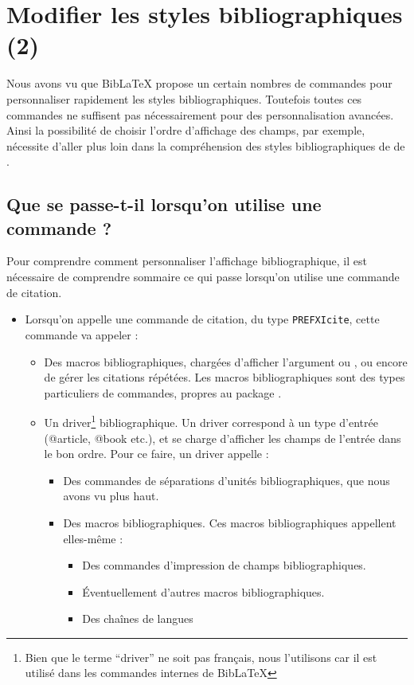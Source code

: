 \chapter{Modifier les styles bibliographiques (2)}

\begin{prealable}
	Nous avons vu que BibLaTeX propose un certain nombres de commandes pour personnaliser rapidement les styles bibliographiques. Toutefois toutes ces commandes ne suffisent pas nécessairement pour des personnalisation avancées. 
	Ainsi la possibilité de choisir l'ordre d'affichage des champs, par exemple, nécessite d'aller plus loin dans la compréhension des styles bibliographiques de de .
\end{prealable}



\section{Que se passe-t-il lorsqu'on utilise une commande  ?}

Pour comprendre comment personnaliser l'affichage bibliographique, il est nécessaire de comprendre sommaire ce qui passe lorsqu'on utilise une commande de citation. 

\begin{itemize}
\item Lorsqu'on appelle une commande de citation, du type \verb|PREFXIcite|, cette commande va appeler :
	\begin{itemize}
		\item Des macros bibliographiques, chargées d'afficher l'argument  ou , ou encore de gérer les citations répétées. Les macros bibliographiques sont des types particuliers de commandes, propres au package . 
		\item Un driver\footnote{Bien que le terme \enquote{driver} ne soit pas français, nous l'utilisons car il est utilisé dans les commandes internes de BibLaTeX} bibliographique. Un driver correspond à un type d'entrée (@article, @book etc.), et se charge d'afficher les champs de l'entrée dans le bon ordre. Pour ce faire, un driver appelle :
		\begin{itemize}
			\item Des commandes de séparations d'unités bibliographiques, que nous avons vu plus haut.
			\item Des macros bibliographiques. Ces macros bibliographiques appellent elles-même :
			\begin{itemize}
				\item Des commandes d'impression de champs bibliographiques.
				\item Éventuellement d'autres macros bibliographiques.
				\item Des chaînes de langues
			\end{itemize}
		\end{itemize}
		
	\end{itemize}
\end{itemize}

